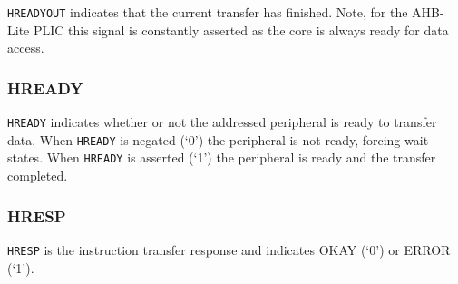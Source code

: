 \texttt{HREADYOUT} indicates that the current transfer has finished.
Note, for the AHB-Lite PLIC this signal is constantly asserted as the
core is always ready for data access.

\subsubsection{HREADY}

\texttt{HREADY} indicates whether or not the addressed peripheral is
ready to transfer data. When \texttt{HREADY} is negated (`0') the
peripheral is not ready, forcing wait states. When \texttt{HREADY} is
asserted (`1') the peripheral is ready and the transfer completed.

\subsubsection{HRESP}

\texttt{HRESP} is the instruction transfer response and indicates OKAY
(`0') or ERROR (`1').

\newpage
